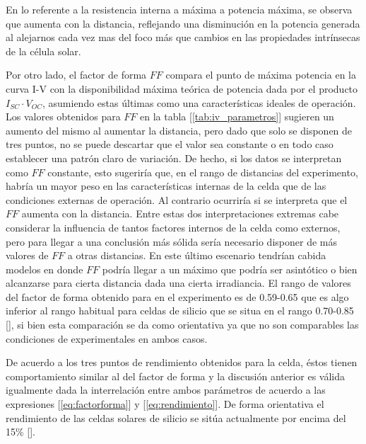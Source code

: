 \vspace{\baselineskip}	

En lo referente a la resistencia interna a máxima a potencia máxima, se observa que aumenta con la distancia, reflejando una disminución en la potencia generada al alejarnos cada vez mas del foco más que cambios en las propiedades intrínsecas de la célula solar. 



\vspace{\baselineskip}	

Por otro lado, el factor de forma $FF$ compara el punto de máxima potencia en la curva I-V con la disponibilidad máxima teórica de potencia dada por el producto $I_{SC}\cdot V_{OC}$, asumiendo estas últimas como una características ideales de operación. Los valores obtenidos para $FF$ en la tabla [\ref{tab:iv_parametros}] sugieren un aumento del mismo al aumentar la distancia, pero dado que solo se disponen de tres puntos,  no se puede descartar que el valor sea constante o en todo caso establecer una patrón claro de variación. De hecho, si los datos se interpretan como $FF$ constante, esto sugeriría que, en el rango de distancias del experimento, habría un mayor peso en las características internas de la celda que de las condiciones externas de operación. Al contrario  ocurriría si se interpreta que el $FF$ aumenta con la distancia. Entre estas dos interpretaciones extremas cabe considerar la influencia de tantos factores internos de la celda como externos, pero para llegar a una conclusión más sólida sería necesario disponer de más valores de $FF$ a otras distancias. En este último escenario tendrían cabida modelos en donde $FF$ podría llegar a un máximo que podría ser asintótico o bien alcanzarse para cierta distancia dada una cierta irradiancia. El rango de valores del factor de forma obtenido para en el experimento es de 0.59-0.65 que es algo inferior al rango habitual para celdas de silicio que se situa en el rango 0.70-0.85 [\cite{solar_eff}], si bien esta comparación se da como orientativa ya que no son comparables las condiciones de experimentales en ambos casos.    

\newpage

De acuerdo a los tres puntos de rendimiento obtenidos para la celda, éstos tienen comportamiento similar al del factor de forma y la discusión anterior es válida igualmente dada la interrelación entre ambos parámetros de acuerdo a las expresiones [\ref{eq:factorforma}] y [\ref{eq:rendimiento}]. De forma orientativa el rendimiento de las celdas solares de silicio se sitúa actualmente por encima del 15\% [\cite{solar_eff}].

